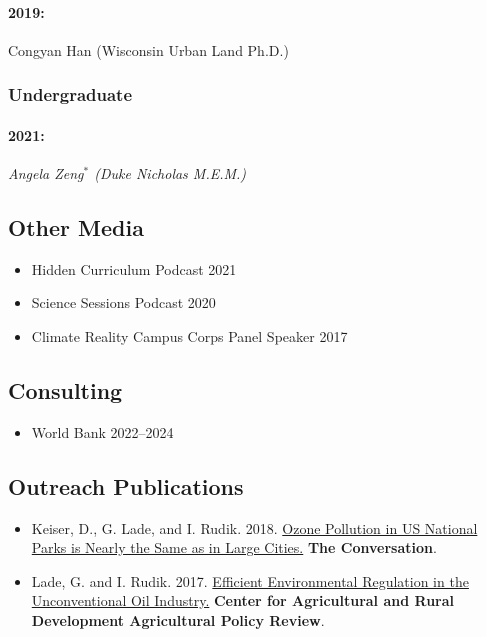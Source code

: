 \documentclass[11pt]{res} %
\begin{document}
\begin{resume}
\paragraph{2019:} Congyan Han (Wisconsin Urban Land Ph.D.)

\vspace{-.2in}

\subsubsection{Undergraduate}\vspace{-.2in}
\paragraph{2021:} \textit{Angela Zeng$^*$  (Duke Nicholas M.E.M.)}

\vspace{-.2in}

\subsection{Other Media}

\begin{itemize} %
	\item[] Hidden Curriculum Podcast \hfill 2021
	\item[] Science Sessions Podcast \hfill 2020
	\item[] Climate Reality Campus Corps Panel Speaker \hfill 2017
\end{itemize}

\vspace{-.2in}

\subsection{Consulting}

\begin{itemize} %
	\item[] World Bank \hfill 2022--2024
\end{itemize}

\vspace{-.2in}

\subsection{Outreach Publications}

\begin{itemize} %
	\item[] Keiser, D., G. Lade, and I. Rudik. 2018. \href{https://theconversation.com/ozone-pollution-in-us-national-parks-is-nearly-the-same-as-in-large-cities-100148}{Ozone Pollution in US National Parks is Nearly the Same as in Large Cities.} \textbf{The Conversation}.
	\item[] Lade, G. and I. Rudik. 2017. \href{https://www.card.iastate.edu/ag_policy_review/display.aspx?id=70}{Efficient Environmental Regulation in the Unconventional Oil Industry.} \textbf{Center for Agricultural and Rural Development Agricultural Policy Review}.
\end{itemize}


\end{resume}
\end{document}
